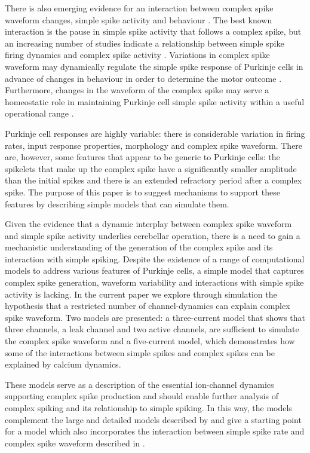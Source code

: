 \documentclass[twocolumn]{svjour3}          %
\begin{document}
There is also emerging evidence for an interaction between complex
spike waveform changes, simple spike activity and behaviour
\citep{YangLispberger2014,StrengEtAl2017}. The best known interaction
is the pause in simple spike activity that follows a complex spike, but
an increasing number of studies indicate a relationship between simple
spike firing dynamics and complex spike activity
\citep{Mano1970,Gilbert1976,CampbellHesslow1986,HashimotoKano1998,ServaisEtAl2004,MarutaEtAl2007,WarnaarEtAl2015,BurroughsEtAl2016}.
Variations in complex spike waveform may dynamically regulate the
simple spike response of Purkinje cells in advance of changes in
behaviour in order to determine the motor outcome
\citep{StrengEtAl2017}. Furthermore, changes in the waveform of the
complex spike may serve a homeostatic role in maintaining Purkinje
cell simple spike activity within a useful operational range
\citep{BurroughsEtAl2016}.

Purkinje cell responses are highly variable: there is considerable
variation in firing rates, input response properties, morphology and
complex spike waveform. There are, however, some features that appear
to be generic to Purkinje cells: the spikelets that make up the
complex spike have a significantly smaller amplitude than the initial
spikes and there is an extended refractory period after a complex
spike. The purpose of this paper is to suggest mechanisms to support
these features by describing simple models that can simulate them.

Given the evidence that a dynamic interplay between complex spike
waveform and simple spike activity underlies cerebellar operation,
there is a need to gain a mechanistic understanding of the generation
of the complex spike and its interaction with simple spiking. Despite
the existence of a range of computational models to address various
features of Purkinje cells, a simple model that captures complex spike
generation, waveform variability and interactions with simple spike
activity is lacking. In the current paper we explore through
simulation the hypothesis that a restricted number of channel-dynamics
can explain complex spike waveform. Two models are presented: a
three-current model that shows that three channels, a leak channel and
two active channels, are sufficient to simulate the complex spike
waveform and a five-current model, which demonstrates how some of the
interactions between simple spikes and complex spikes can be explained
by calcium dynamics.

These models serve as a description of the essential ion-channel
dynamics supporting complex spike production and should enable further
analysis of complex spiking and its relationship to simple spiking. In
this way, the models complement the large and detailed models
described by \citet{VeysEtAl2013,ZangEtAl2018} and give a starting
point for a model which also incorporates the interaction between
simple spike rate and complex spike waveform described in
\citet{BurroughsEtAl2016}.
\end{document}
